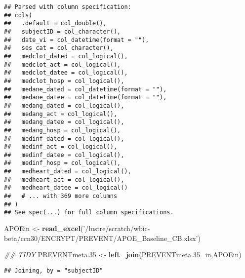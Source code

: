 \documentclass[]{article}
\newenvironment{Shaded}{\begin{snugshade}}{\end{snugshade}}
\newcommand{\CommentTok}[1]{\textcolor[rgb]{0.56,0.35,0.01}{\textit{#1}}}
\newcommand{\FloatTok}[1]{\textcolor[rgb]{0.00,0.00,0.81}{#1}}
\newcommand{\KeywordTok}[1]{\textcolor[rgb]{0.13,0.29,0.53}{\textbf{#1}}}
\newcommand{\NormalTok}[1]{#1}
\newcommand{\StringTok}[1]{\textcolor[rgb]{0.31,0.60,0.02}{#1}}
\begin{document}
\begin{verbatim}
## Parsed with column specification:
## cols(
##   .default = col_double(),
##   subjectID = col_character(),
##   date_vi = col_datetime(format = ""),
##   ses_cat = col_character(),
##   medclot_dated = col_logical(),
##   medclot_act = col_logical(),
##   medclot_datee = col_logical(),
##   medclot_hosp = col_logical(),
##   medane_dated = col_datetime(format = ""),
##   medane_datee = col_datetime(format = ""),
##   medang_dated = col_logical(),
##   medang_act = col_logical(),
##   medang_datee = col_logical(),
##   medang_hosp = col_logical(),
##   medinf_dated = col_logical(),
##   medinf_act = col_logical(),
##   medinf_datee = col_logical(),
##   medinf_hosp = col_logical(),
##   medheart_dated = col_logical(),
##   medheart_act = col_logical(),
##   medheart_datee = col_logical()
##   # ... with 369 more columns
## )
## See spec(...) for full column specifications.
\end{verbatim}

\begin{Shaded}
\begin{Highlighting}[]
\NormalTok{APOEin <-}\StringTok{ }\KeywordTok{read_excel}\NormalTok{(}\StringTok{'/lustre/scratch/wbic-beta/ccn30/ENCRYPT/PREVENT/APOE_Baseline_CB.xlsx'}\NormalTok{)}

\CommentTok{## TIDY}
\NormalTok{PREVENTmeta}\FloatTok{.35}\NormalTok{ <-}\StringTok{ }\KeywordTok{left_join}\NormalTok{(PREVENTmeta}\FloatTok{.35}\NormalTok{_in,APOEin)}
\end{Highlighting}
\end{Shaded}

\begin{verbatim}
## Joining, by = "subjectID"
\end{verbatim}
\end{document}
